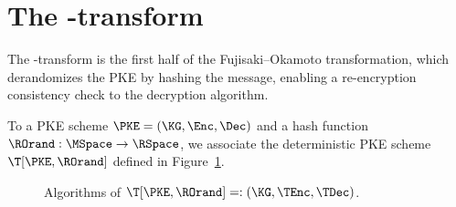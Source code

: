 \section{The \T-transform}\label{sec:ttransform}
  The \T-transform is the first half of the Fujisaki--Okamoto transformation,
    which derandomizes the PKE by hashing the message, enabling a re-encryption consistency check
    to the decryption algorithm.
  \begin{definition}[\T-transform]
  	To a PKE scheme $\PKE = (\KG, \Enc, \Dec)$ and a hash function $\ROrand:\MSpace \rightarrow \RSpace$,
  	we associate the deterministic PKE scheme $\T[\PKE, \ROrand]$ defined in Figure~\ref{fig:def:T-transform}.
  	
  	\begin{figure}[ht]
  		\begin{center}
  		\end{center}
  		\caption{Algorithms of $\T[\PKE, \ROrand]=: (\KG, \TEnc, \TDec)$.}
  		\label{fig:def:T-transform}
  	\end{figure}

  \end{definition}
